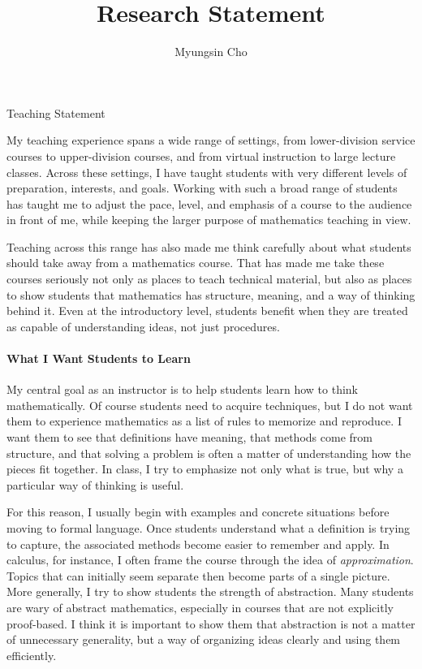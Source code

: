 \documentclass[11pt]{article}
\title{Research Statement}
\author{Myungsin Cho}
\date{}
\begin{document}
\begin{center}\LARGE{Teaching Statement}\end{center}

My teaching experience spans a wide range of settings, from lower-division service courses to upper-division courses, and from virtual instruction to large lecture classes. Across these settings, I have taught students with very different levels of preparation, interests, and goals. Working with such a broad range of students has taught me to adjust the pace, level, and emphasis of a course to the audience in front of me, while keeping the larger purpose of mathematics teaching in view.

Teaching across this range has also made me think carefully about what students should take away from a mathematics course. 
That has made me take these courses seriously not only as places to teach technical material, but also as places to show students that mathematics has structure, meaning, and a way of thinking behind it. Even at the introductory level, students benefit when they are treated as capable of understanding ideas, not just procedures.

\paragraph{What I Want Students to Learn}\quad

My central goal as an instructor is to help students learn how to think mathematically. Of course students need to acquire techniques, but I do not want them to experience mathematics as a list of rules to memorize and reproduce. I want them to see that definitions have meaning, that methods come from structure, and that solving a problem is often a matter of understanding how the pieces fit together. In class, I try to emphasize not only what is true, but why a particular way of thinking is useful.

For this reason, I usually begin with examples and concrete situations before moving to formal language. Once students understand what a definition is trying to capture, the associated methods become easier to remember and apply. In calculus, for instance, I often frame the course through the idea of \emph{approximation}. Topics that can initially seem separate then become parts of a single picture. More generally, I try to show students the strength of abstraction. Many students are wary of abstract mathematics, especially in courses that are not explicitly proof-based. I think it is important to show them that abstraction is not a matter of unnecessary generality, but a way of organizing ideas clearly and using them efficiently.
\end{document}
